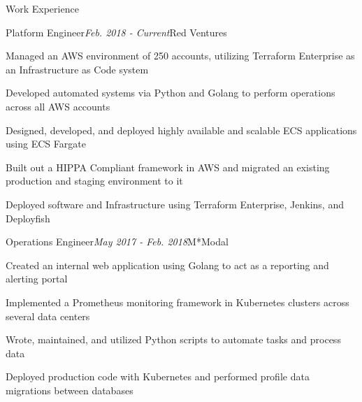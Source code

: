 \documentclass{resume} %
\begin{document}
\begin{rSection}{\vspace{-5pt}Work Experience}

\begin{rSubsection}{Platform Engineer}{\em Feb. 2018 - Current}{Red Ventures}{}
\item {Managed an AWS environment of 250 accounts, utilizing Terraform Enterprise as an Infrastructure as Code system}
\item {Developed automated systems via Python and Golang to perform operations across all AWS accounts}
\item {Designed, developed, and deployed highly available and scalable ECS applications using ECS Fargate}
\item {Built out a HIPPA Compliant framework in AWS and migrated an existing production and staging environment to it }
\item {Deployed software and Infrastructure using Terraform Enterprise, Jenkins, and Deployfish}

\end{rSubsection}



\begin{rSubsection}{Operations Engineer}{\em May 2017 - Feb. 2018}{M*Modal}{}
\item {Created an internal web application using Golang to act as a reporting and alerting portal}
\item {Implemented a Prometheus monitoring framework in Kubernetes clusters across several data centers}
\item {Wrote, maintained, and utilized Python scripts to automate tasks and process data}
\item {Deployed production code with Kubernetes and performed profile data migrations between databases}
\end{rSubsection}

\end{rSection}
\end{document}

